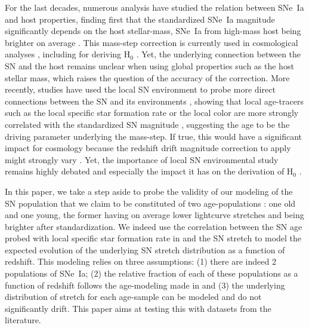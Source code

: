 \documentclass[]{aa} %
\newcommand{\nn}[1]{{\textcolor[rgb]{1, 0.27, 0}{#1}}}
\begin{document}
For the last decades, numerous analysis have studied the relation between SNe~Ia
and host properties\nn{,} finding first that the standardized SNe~Ia magnitude
significantly depends on the host stellar-mass, SNe~Ia from high-mass host
\nn{being brighter on average}
\cite[e.g.][]{kelly2010, sullivan2010, childress2013, betoule2014, rigault2018, kim19}.
This mass-step correction is currently used in cosmological analyses
\citep[e.g.][]{betoule2014, scolnic2018a}, including for deriving H$_0$
\citep{riess2016, riess2019}. Yet, the underlying connection between the SN and
the host remains unclear when using global properties such as the host stellar
mass, which raises the question of the accuracy of the correction. More
recently, studies have used the local SN environment to probe more direct
connections between the SN and its environments \citep{rigault2013}\nn{,}
showing that local age-tracers such as the local specific star formation rate or
the local color are more strongly correlated with the standardized SN magnitude
\citep{rigault2018, roman2018, kim18}, suggesting the age to be the driving parameter
underlying the mass-step. If true, this would have a significant impact for
cosmology because the redshift drift magnitude correction to apply might
strongly vary \citep{rigault2013,childress2014,scolnic2018a}.  Yet, the
importance of local SN environmental study remains highly debated
\cite[e.g.][]{jones2015,jones2019} and especially the impact it has on the
derivation of H$_0$ \citep{jones2015,riess2016,riess2018,rose2019}. 

In this paper, we take a step aside to probe the validity of our modeling of the
SN population that we claim to be constituted of two age-populations
\citep{rigault2013,rigault2015,rigault2018}: one old and one young, the former
having on average lower lightcurve stretches and being brighter after
standardization. We indeed use the correlation between the SN age probed with
local specific star formation rate in \cite{rigault2018} and the SN stretch to
model the expected evolution of the underlying SN stretch distribution as a
function of redshift. This modeling relies on three assumptions: (1) there
\nn{are indeed} 2 populations of SNe~Ia; (2) the relative fraction of each of
these populations as a function of redshift follows the age-modeling made in
\citep{rigault2018} and (3) the underlying distribution of stretch for each
age-sample can be modeled and do not significantly drift. This paper aims at
testing this with datasets from the literature. 
\end{document}
